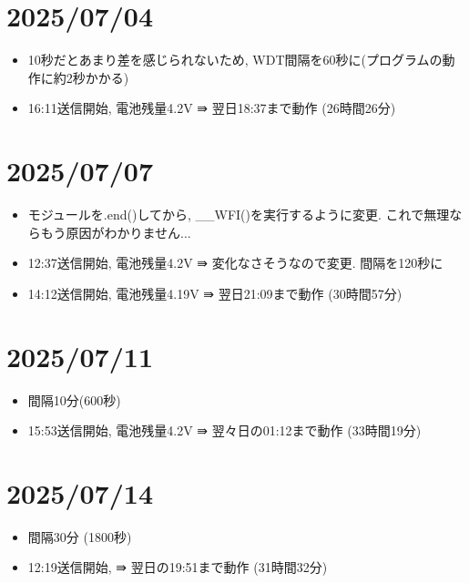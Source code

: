 \section{2025/07/04}
\begin{itemize}
    \item 10秒だとあまり差を感じられないため, WDT間隔を60秒に(プログラムの動作に約2秒かかる)
    \item 16:11送信開始, 電池残量4.2V ⇛ 翌日18:37まで動作 (26時間26分)
\end{itemize}

\section{2025/07/07}
\begin{itemize}
    \item モジュールを.end()してから, __WFI()を実行するように変更. これで無理ならもう原因がわかりません$\dots$
    \item 12:37送信開始, 電池残量4.2V ⇛ 変化なさそうなので変更. 間隔を120秒に
    \item 14:12送信開始, 電池残量4.19V ⇛ 翌日21:09まで動作 (30時間57分)
\end{itemize}

\section{2025/07/11}
\begin{itemize}
    \item 間隔10分(600秒)
    \item 15:53送信開始, 電池残量4.2V ⇛ 翌々日の01:12まで動作 (33時間19分)
\end{itemize}

\section{2025/07/14}
\begin{itemize}
    \item 間隔30分 (1800秒)
    \item 12:19送信開始, ⇛ 翌日の19:51まで動作 (31時間32分)
\end{itemize}

